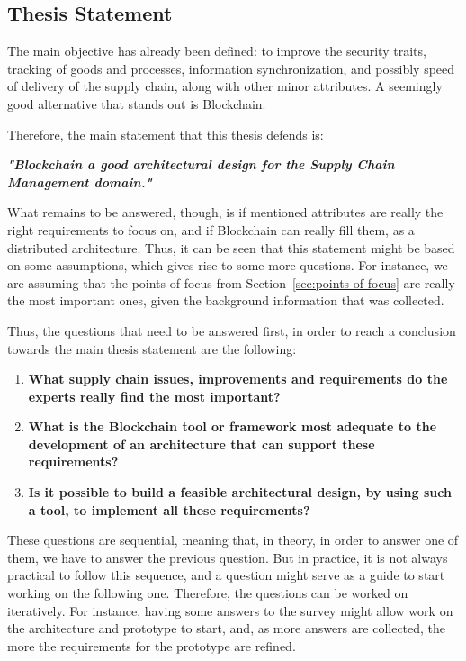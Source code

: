 \subsection{Thesis Statement}
\label{subsec:thesis-statement}
The main objective has already been defined: to improve the security traits, tracking of goods and processes, information synchronization, and possibly speed of delivery of the supply chain, along with other minor attributes. A seemingly good alternative that stands out is Blockchain. 

Therefore, the main statement that this thesis defends is: 

\par \textbf{\textit{"Blockchain a good architectural design for the Supply Chain Management domain."}}

What remains to be answered, though, is if mentioned attributes are really the right requirements to focus on, and if Blockchain can really fill them, as a distributed architecture. Thus, it can be seen that this statement might be based on some assumptions, which gives rise to some more questions. For instance, we are assuming that the points of focus from Section~\ref{sec:points-of-focus} are really the most important ones, given the background information that was collected.

Thus, the questions that need to be answered first, in order to reach a conclusion towards the main thesis statement are the following:
\begin{enumerate}
\item \textbf{What supply chain issues, improvements and requirements do the experts really find the most important?}
\item \textbf{What is the Blockchain tool or framework most adequate to the development of an architecture that can support these requirements?}
\item \textbf{Is it possible to build a feasible architectural design, by using such a tool, to implement all these requirements?}
\end{enumerate}

These questions are sequential, meaning that, in theory, in order to answer one of them, we have to answer the previous question. But in practice, it is not always practical to follow this sequence, and a question might serve as a guide to start working on the following one. Therefore, the questions can be worked on iteratively. For instance, having some answers to the survey might allow work on the architecture and prototype to start, and, as more answers are collected, the more the requirements for the prototype are refined.

